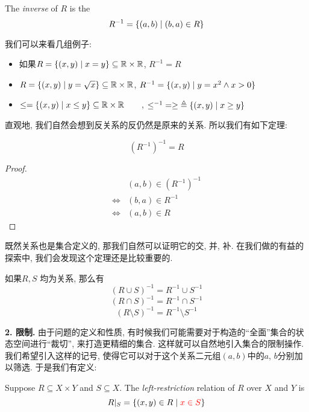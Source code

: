 \begin{definition}[逆 (Inverse)]
  The {\it inverse} of $R$ is the 
  \[
    R^{-1} = \{(a, b) \mid (b, a) \in R\}
  \]
\end{definition}

我们可以来看几组例子: 
\begin{itemize}
  \item 如果$R = \{(x, y) \mid x = y\}\subseteq \mathbb{R} \times \mathbb{R}$, $R^{-1} = R$
  \item $R = \{(x, y) \mid y = \sqrt{x}\} \subseteq \mathbb{R} \times \mathbb{R}$, $R^{-1} = \{(x, y) \mid y = x^{2} \land x > 0\}$
  \item $\le = \{(x, y) \mid x \le y\} \subseteq \mathbb{R} \times \mathbb{R} \qquad$, $\le^{-1} \;= \ge \;\triangleq \{(x, y) \mid x \ge y\}$
\end{itemize}

直观地, 我们自然会想到反关系的反仍然是原来的关系. 所以我们有如下定理: 

\begin{theorem}
  \[
    (R^{-1})^{-1} = R
  \]
\end{theorem}

\begin{proof}
  \setcounter{equation}{0}
  \begin{align*}
    &(a, b) \in (R^{-1})^{-1} \\
    \iff& (b, a) \in R^{-1} \\
    \iff& (a, b) \in R
  \end{align*}
\end{proof}

既然关系也是集合定义的, 那我们自然可以证明它的交, 并, 补. 在我们做的有益的探索中, 我们会发现这个定理还是比较重要的. 

\begin{theorem}[关系的逆]
    如果$R, S$ 均为关系, 那么有
  \[
    (R \cup S)^{-1} = R^{-1} \cup S^{-1}
  \]
  \[
    (R \cap S)^{-1} = R^{-1} \cap S^{-1}
  \]
  \[
    (R \setminus S)^{-1} = R^{-1} \setminus S^{-1}
  \]
\end{theorem}

\textbf{2. 限制. } 由于问题的定义和性质, 有时候我们可能需要对于构造的``全面''集合的状态空间进行``裁切'', 来打造更精细的集合. 这样就可以自然地引入集合的限制操作. 我们希望引入这样的记号, 使得它可以对于这个关系二元组$(a,b)$中的$a$, $b$分别加以筛选. 于是我们有定义: 

\begin{definition}
  Suppose $R \subseteq X \times Y$ and $S \subseteq X$.
  The {\it left-restriction} relation of $R$  over $X$ and $Y$ is
  \[
    R|_{S} = \{(x, y) \in R \mid \textcolor{red}{x \in S}\}
  \]
\end{definition}

